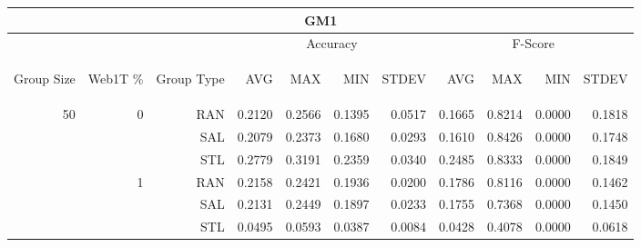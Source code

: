 \begin{center}
\begin{table}[htbp]
\begin{tabular}{ | r | r | r | r | r | r | r | r | r | r | r |}
\hline
\multicolumn{11}{|c|}{GM1}\\
\hline
 & & & \multicolumn{4}{|c|}{Accuracy} & \multicolumn{4}{|c|}{F-Score}\\ \cline{4-11}
\begin{sideways}Group Size\end{sideways} & \begin{sideways}Web1T \%\end{sideways} & \begin{sideways}Group Type\end{sideways} & \begin{sideways}AVG\end{sideways} & \begin{sideways}MAX\end{sideways} & \begin{sideways}MIN\end{sideways} & \begin{sideways}STDEV\end{sideways} & \begin{sideways}AVG\end{sideways} & \begin{sideways}MAX\end{sideways} & \begin{sideways}MIN\end{sideways} & \begin{sideways}STDEV\end{sideways}\\
\hline
\multirow{18}{*}{50}
 & \multirow{3}{*}{0} & RAN & 0.2120 & 0.2566 & 0.1395 & 0.0517 & 0.1665 & 0.8214 & 0.0000 & 0.1818\\ \cline{3-11}
 &   & SAL & 0.2079 & 0.2373 & 0.1680 & 0.0293 & 0.1610 & 0.8426 & 0.0000 & 0.1748\\ \cline{3-11}
 &   & STL & 0.2779 & 0.3191 & 0.2359 & 0.0340 & 0.2485 & 0.8333 & 0.0000 & 0.1849\\ \cline{2-11}
 & \multirow{3}{*}{1} & RAN & 0.2158 & 0.2421 & 0.1936 & 0.0200 & 0.1786 & 0.8116 & 0.0000 & 0.1462\\ \cline{3-11}
 &   & SAL & 0.2131 & 0.2449 & 0.1897 & 0.0233 & 0.1755 & 0.7368 & 0.0000 & 0.1450\\ \cline{3-11}
 &   & STL & 0.0495 & 0.0593 & 0.0387 & 0.0084 & 0.0428 & 0.4078 & 0.0000 & 0.0618\\ \cline{2-11}

\end{tabular}
\end{table}
\end{center}
